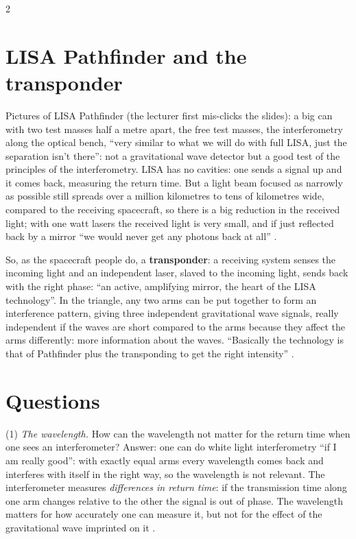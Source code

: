 \begin{paracol}{2}
\section{LISA Pathfinder and the transponder}\label{sec:c28-lisa}

Pictures of LISA Pathfinder (the lecturer first mis-clicks the slides): a big can with two test masses half a metre apart, the free test masses, the interferometry along the optical bench, ``very similar to what we will do with full LISA, just the separation isn't there'': not a gravitational wave detector but a good test of the principles of the interferometry. LISA has no cavities: one sends a signal up and it comes back, measuring the return time. But a light beam focused as narrowly as possible still spreads over a million kilometres to tens of kilometres wide, compared to the receiving spacecraft, so there is a big reduction in the received light; with one watt lasers the received light is very small, and if just reflected back by a mirror ``we would never get any photons back at all'' .

So, as the spacecraft people do, a \textbf{transponder}: a receiving system senses the incoming light and an independent laser, slaved to the incoming light, sends back with the right phase: ``an active, amplifying mirror, the heart of the LISA technology''. In the triangle, any two arms can be put together to form an interference pattern, giving three independent gravitational wave signals, really independent if the waves are short compared to the arms because they affect the arms differently: more information about the waves. ``Basically the technology is that of Pathfinder plus the transponding to get the right intensity'' .

\section{Questions}\label{sec:c28-questions}

\begin{coursenote}
(1) \emph{The wavelength.} How can the wavelength not matter for the return time when one sees an interferometer? Answer: one can do white light interferometry ``if I am really good'': with exactly equal arms every wavelength comes back and interferes with itself in the right way, so the wavelength is not relevant. The interferometer measures \emph{differences in return time}: if the transmission time along one arm changes relative to the other the signal is out of phase. The wavelength matters for how accurately one can measure it, but not for the effect of the gravitational wave imprinted on it .


\end{coursenote}
\end{paracol}
